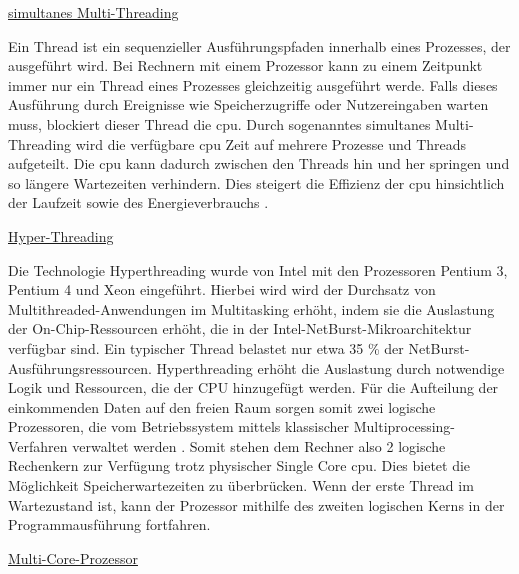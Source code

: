 \underline{simultanes Multi-Threading}

Ein Thread ist ein sequenzieller Ausführungspfaden innerhalb eines Prozesses, der ausgeführt wird. Bei Rechnern mit einem Prozessor kann zu einem Zeitpunkt immer nur ein Thread eines Prozesses gleichzeitig ausgeführt werde. Falls dieses Ausführung durch Ereignisse wie Speicherzugriffe oder Nutzereingaben warten muss, blockiert dieser Thread die \ac{cpu}. Durch sogenanntes simultanes Multi-Threading wird die verfügbare \ac{cpu} Zeit auf mehrere Prozesse und Threads aufgeteilt. Die \ac{cpu} kann dadurch zwischen den Threads hin und her springen und so längere Wartezeiten verhindern. Dies steigert die Effizienz der \ac{cpu} hinsichtlich der Laufzeit sowie des Energieverbrauchs \cite[877]{cplusplus}.

\underline{Hyper-Threading}

Die Technologie Hyperthreading wurde von Intel mit den Prozessoren Pentium 3, Pentium 4 und Xeon eingeführt. Hierbei wird wird der Durchsatz von Multithreaded-Anwendungen im Multitasking erhöht, indem sie die Auslastung der On-Chip-Ressourcen erhöht, die in der Intel-NetBurst-Mikroarchitektur verfügbar sind. Ein typischer Thread belastet nur etwa 35 \% der NetBurst-Ausführungsressourcen. Hyperthreading erhöht die Auslastung durch notwendige Logik und Ressourcen, die der CPU hinzugefügt werden. Für die Aufteilung der einkommenden Daten auf den freien Raum sorgen somit zwei logische Prozessoren, die vom Betriebssystem mittels klassischer Multiprocessing-Verfahren verwaltet werden \cite[1138]{wolf2020}. Somit stehen dem Rechner also 2 logische Rechenkern zur Verfügung trotz physischer Single Core \ac{cpu}. Dies bietet die Möglichkeit Speicherwartezeiten zu überbrücken. Wenn der erste Thread im Wartezustand ist, kann der Prozessor mithilfe des zweiten logischen Kerns in der Programmausführung fortfahren.

\underline{Multi-Core-Prozessor}

